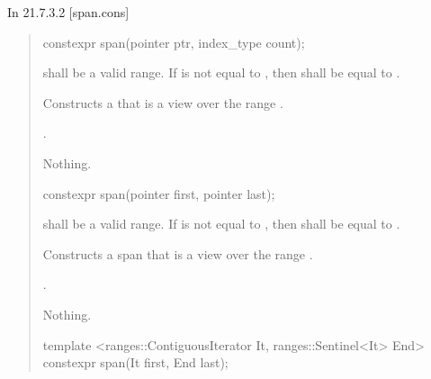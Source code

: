 \documentclass{wg21}
\begin{document}
In 21.7.3.2 [span.cons]

\begin{quote}
	
\begin{itemdecl}
constexpr span(pointer ptr, index_type count);
\end{itemdecl}
\begin{itemdescr}
	\pnum
	\requires {} shall be a valid range.
	If  is not equal to ,
	then  shall be equal to .
	
	\pnum
	\effects
	Constructs a  that is a view over the range .
	
	\pnum
	\ensures
	.
	
	\pnum
	\throws
	Nothing.
\end{itemdescr}

	
\begin{removedblock}
\begin{itemdecl}
constexpr span(pointer first, pointer last);
\end{itemdecl}
\end{removedblock}
\begin{removedblock}

\begin{itemdescr}
	\pnum
	\requires
	 shall be a valid range.
	If  is not equal to ,
	then  shall be equal to .
	
	\pnum
	\effects
	Constructs a span that is a view over the range .
	
	\pnum
	\ensures
	.
	
	\pnum
	\throws
	Nothing.
\end{itemdescr}
\end{removedblock}

\begin{addedblock}
\begin{itemdecl}
template <ranges::ContiguousIterator It, ranges::Sentinel<It> End>
constexpr span(It first, End last);
\end{itemdecl}
\end{addedblock}

\begin{addedblock}

\begin{itemdescr}


\end{itemdescr}
\end{addedblock}
\end{quote}
\end{document}

